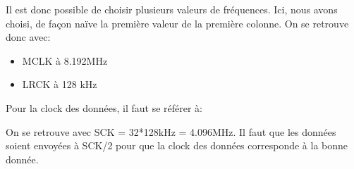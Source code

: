 \documentclass[a4paper]{article}
\begin{document}
\begin{center}
\noindent{}
\end{center}

Il est donc possible de choisir plusieurs valeurs de fréquences. Ici, nous avons choisi,
de façon naïve la première valeur de la première colonne. On se retrouve donc avec:

\begin{itemize}
  \item MCLK à 8.192MHz
  \item LRCK à 128 kHz
\end{itemize}

Pour la clock des données, il faut se référer à:
\begin{center}
\noindent{}
\end{center}
On se retrouve avec SCK = 32*128kHz = 4.096MHz. Il faut que les données soient envoyées à
SCK/2 pour que la clock des données corresponde à la bonne donnée.
\end{document}
